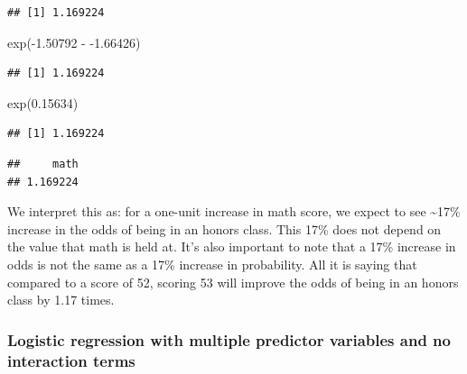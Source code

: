 \documentclass[
]{article}
\newenvironment{Shaded}{\begin{snugshade}}{\end{snugshade}}
\newcommand{\DecValTok}[1]{\textcolor[rgb]{0.00,0.00,0.81}{#1}}
\newcommand{\FloatTok}[1]{\textcolor[rgb]{0.00,0.00,0.81}{#1}}
\newcommand{\FunctionTok}[1]{\textcolor[rgb]{0.00,0.00,0.00}{#1}}
\newcommand{\NormalTok}[1]{#1}
\newcommand{\SpecialCharTok}[1]{\textcolor[rgb]{0.00,0.00,0.00}{#1}}
\begin{document}
\begin{verbatim}
## [1] 1.169224
\end{verbatim}

\begin{Shaded}
\begin{Highlighting}[]
\FunctionTok{exp}\NormalTok{(}\SpecialCharTok{{-}}\FloatTok{1.50792} \SpecialCharTok{{-}} \SpecialCharTok{{-}}\FloatTok{1.66426}\NormalTok{)}
\end{Highlighting}
\end{Shaded}

\begin{verbatim}
## [1] 1.169224
\end{verbatim}

\begin{Shaded}
\begin{Highlighting}[]
\FunctionTok{exp}\NormalTok{(}\FloatTok{0.15634}\NormalTok{)}
\end{Highlighting}
\end{Shaded}

\begin{verbatim}
## [1] 1.169224
\end{verbatim}

\begin{Shaded}
\end{Shaded}

\begin{verbatim}
##     math 
## 1.169224
\end{verbatim}

We interpret this as: for a one-unit increase in math score, we expect
to see \textasciitilde17\% increase in the odds of being in an honors
class. This 17\% does not depend on the value that math is held at. It's
also important to note that a 17\% increase in odds is not the same as a
17\% increase in probability. All it is saying that compared to a score
of 52, scoring 53 will improve the odds of being in an honors class by
1.17 times.

\hypertarget{logistic-regression-with-multiple-predictor-variables-and-no-interaction-terms}{%
\subsubsection{Logistic regression with multiple predictor variables and
no interaction
terms}\label{logistic-regression-with-multiple-predictor-variables-and-no-interaction-terms}}
\end{document}
